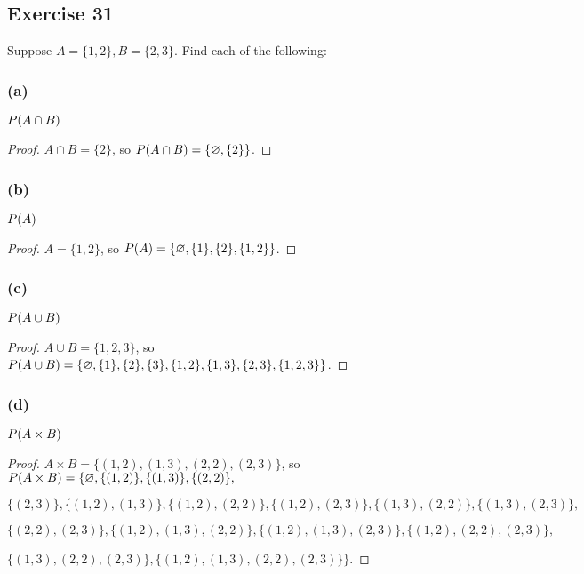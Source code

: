 \documentclass[14pt]{extarticle}
\let\mathscr\relax
\newcommand{\ps}{\mathscr{P}}
\newcommand{\es}{\varnothing}
\begin{document}
\subsection{Exercise 31}
Suppose \(A = \{1, 2\}, B = \{2, 3\}\). Find each of the following:

\subsubsection{(a)}
\(\ps(A \cap B)\)

\begin{proof}
  \(A \cap B = \{2\}\), so \(\ps(A \cap B) = \{\es, \{2\}\}\).
\end{proof}

\subsubsection{(b)}
\(\ps(A)\)

\begin{proof}
  \(A = \{1, 2\}\), so \(\ps(A) = \{\es, \{1\}, \{2\}, \{1, 2\}\}\).
\end{proof}

\subsubsection{(c)}
\(\ps(A \cup B)\)

\begin{proof}
  \(A \cup B = \{1, 2, 3\}\), so \(\ps(A \cup B) = \{\es, \{1\}, \{2\}, \{3\}, \{1, 2\}, \{1, 3\}, \{2, 3\}, \{1, 2, 3\}\}\).
\end{proof}

\subsubsection{(d)}
\(\ps(A \times B)\)

\begin{proof}
  \(A \times B = \{(1, 2), (1, 3), (2, 2), (2, 3)\}\), so \(\ps(A\times B)=\{\es, \{(1, 2)\},\{(1, 3)\},\{(2, 2)\},\)

  \(\{(2, 3)\}, \{(1, 2), (1, 3)\}, \{(1, 2), (2, 2)\}, \{(1, 2), (2, 3)\}, \{(1, 3), (2, 2)\}, \{(1, 3), (2, 3)\}, \)

  \(\{(2, 2), (2, 3)\}, \{(1, 2), (1, 3), (2, 2)\}, \{(1, 2), (1, 3), (2, 3)\}, \{(1, 2), (2, 2), (2, 3)\}, \)

  \(\{(1, 3), (2, 2), (2, 3)\}, \{(1, 2), (1, 3), (2, 2), (2, 3)\}\}\).
\end{proof}
\end{document}
